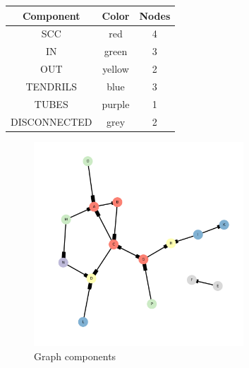 \documentclass[12pt, a4paper]{article}
\begin{document}
\begin{table}[h]
    \centering
    \begin{tabular}{|c|c|c|}
        \hline
        Component    & Color  & Nodes \\ \hline
        SCC          & red    & 4     \\ \hline
        IN           & green  & 3     \\ \hline
        OUT          & yellow & 2     \\ \hline
        TENDRILS     & blue   & 3     \\ \hline
        TUBES        & purple & 1     \\ \hline
        DISCONNECTED & grey   & 2     \\ \hline
    \end{tabular}
\end{table}

\begin{figure}[h]
    \centering
    \caption{Graph components}
    \includegraphics[width=0.70\textwidth]{dia/graph_components.png}
\end{figure}
\end{document}
